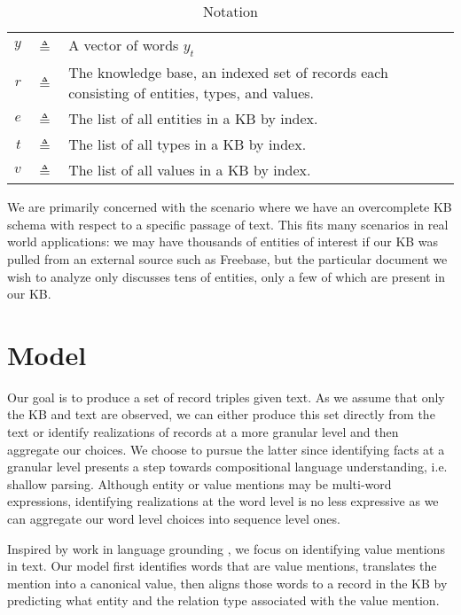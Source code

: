 \documentclass[12pt]{article}
\begin{document}
\begin{table}[htbp]\caption{Notation}
\centering %
\begin{tabular}{r c p{10cm} }
\toprule
$y$ & $\triangleq$ & A vector of words $y_t$\\
$r$ & $\triangleq$ & The knowledge base,
    an indexed set of records each consisting of entities, types, and values.\\
$e$ & $\triangleq$ & The list of all entities in a KB by index.\\
$t$ & $\triangleq$ & The list of all types in a KB by index.\\
$v$ & $\triangleq$ & The list of all values in a KB by index.\\
\bottomrule
\end{tabular}
\label{tab:TableOfNotationForMyResearch}
\end{table}


We are primarily concerned with the scenario where we have an overcomplete KB schema with
respect to a specific passage of text.
This fits many scenarios in real world applications:
we may have thousands of entities of interest if our KB was pulled from an 
external source such as Freebase,
but the particular document we wish to analyze only discusses tens of entities,
only a few of which are present in our KB.

\section{Model}
Our goal is to produce a set of record triples given text.
As we assume that only the KB and text are observed,
we can either produce this set directly from the text or identify realizations of
records at a more granular level and then aggregate our choices.
We choose to pursue the latter since identifying facts at a granular level
presents a step towards compositional language understanding,
i.e. shallow parsing.
Although entity or value mentions may be multi-word expressions,
identifying realizations at the word level is no less expressive as
we can aggregate our word level choices into sequence level ones.

Inspired by work in language grounding \cite{liang2009},
we focus on identifying value mentions in text.
Our model first identifies words that are value mentions,
translates the mention into a canonical value,
then aligns those words to a record in the KB by predicting what
entity and the relation type associated with the value mention.
\end{document}

